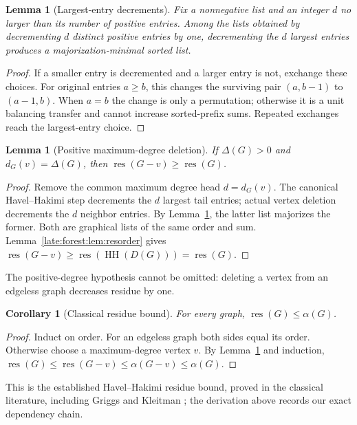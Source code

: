 \documentclass[11pt,a4paper]{article}
\newtheorem{lemma}[theorem]{Lemma}
\newtheorem{corollary}[theorem]{Corollary}
\theoremstyle{definition}\newtheorem{definition}[theorem]{Definition}
\theoremstyle{remark}\newtheorem{remark}[theorem]{Remark}
\newcommand{\res}{\operatorname{res}}
\begin{document}
\begin{lemma}[Largest-entry decrements]\label{late:forest:lem:decrement}
Fix a nonnegative list and an integer $d$ no larger than its number of positive
entries. Among the lists obtained by decrementing $d$ distinct positive
entries by one, decrementing the $d$ largest entries produces a
majorization-minimal sorted list.
\end{lemma}
\begin{proof}
If a smaller entry is decremented and a larger entry is not, exchange these
choices. For original entries $a\ge b$, this changes the surviving pair
$(a,b-1)$ to $(a-1,b)$. When $a=b$ the change is only a permutation; otherwise
it is a unit balancing transfer and cannot increase sorted-prefix sums.
Repeated exchanges reach the largest-entry choice.
\end{proof}

\begin{lemma}[Positive maximum-degree deletion]\label{late:forest:lem:deletion}
If $\Delta(G)>0$ and $d_G(v)=\Delta(G)$, then $\res(G-v)\ge \res(G)$.
\end{lemma}
\begin{proof}
Remove the common maximum degree head $d=d_G(v)$. The canonical
Havel--Hakimi step decrements the $d$ largest tail entries; actual vertex
deletion decrements the $d$ neighbor entries. By
Lemma~\ref{late:forest:lem:decrement}, the latter list majorizes the former. Both are
graphical lists of the same order and sum. Lemma~\ref{late:forest:lem:resorder} gives
$\res(G-v)\ge \res(\operatorname{HH}(D(G)))=\res(G)$.
\end{proof}

The positive-degree hypothesis cannot be omitted: deleting a vertex from an
edgeless graph decreases residue by one.

\begin{corollary}[Classical residue bound]\label{late:forest:cor:alpha}
For every graph, $\res(G)\le\alpha(G)$.
\end{corollary}
\begin{proof}
Induct on order. For an edgeless graph both sides equal its order. Otherwise
choose a maximum-degree vertex $v$. By Lemma~\ref{late:forest:lem:deletion} and induction,
$\res(G)\le \res(G-v)\le\alpha(G-v)\le\alpha(G)$.
\end{proof}

This is the established Havel--Hakimi residue bound, proved in the classical
literature, including Griggs and Kleitman \cite{late:forest:GK}; the derivation above
records our exact dependency chain.
\end{document}
